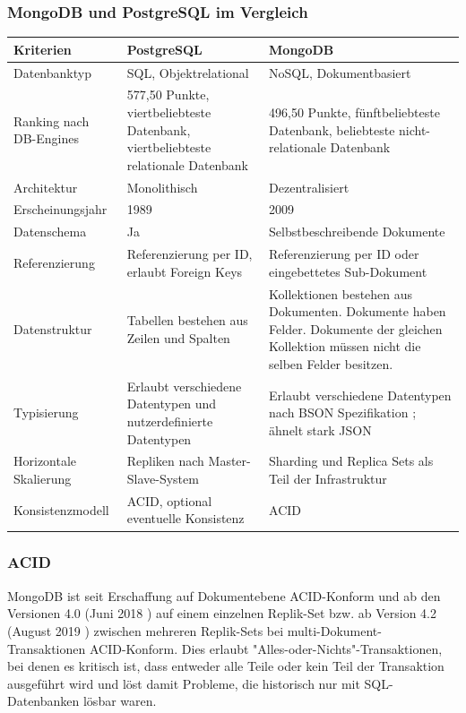 \subsubsection{MongoDB und PostgreSQL im Vergleich}

\begin{center}
    \begin{tabularx}{\linewidth}{ |X|X|X| } 
     \hline
     Kriterien & PostgreSQL & MongoDB  \\ 
     \hline
     Datenbanktyp & SQL, Objektrelational & NoSQL, Dokumentbasiert \\
     Ranking nach DB-Engines \cite{DB1} & 577,50 Punkte, viertbeliebteste Datenbank, viertbeliebteste relationale Datenbank & 496,50 Punkte, fünftbeliebteste Datenbank, beliebteste nicht-relationale Datenbank \cite{DB2} \\
     Architektur & Monolithisch & Dezentralisiert \\
     Erscheinungsjahr & 1989 & 2009 \\
     Datenschema & Ja & Selbstbeschreibende Dokumente\\
     Referenzierung & Referenzierung per ID, erlaubt Foreign Keys & Referenzierung per ID oder eingebettetes Sub-Dokument \\
     Datenstruktur & Tabellen bestehen aus Zeilen und Spalten & Kollektionen bestehen aus Dokumenten. Dokumente haben Felder. Dokumente der gleichen Kollektion müssen nicht die selben Felder besitzen. \\
     Typisierung & Erlaubt verschiedene Datentypen und nutzerdefinierte Datentypen\cite{PG5} & Erlaubt verschiedene Datentypen nach BSON Spezifikation \cite{MG3}; ähnelt stark JSON \\
     Horizontale Skalierung & Repliken nach Master-Slave-System \cite{PG6} & Sharding und Replica Sets als Teil der Infrastruktur \cite{MG4} \cite{MG5} \\
     Konsistenzmodell & ACID, optional eventuelle Konsistenz \cite{MG6} \cite{MG7} & ACID \\
     \hline
    \end{tabularx}
    \cite{DB3} \cite{DB4}
\end{center}

\subsubsection{ACID}
 MongoDB ist seit Erschaffung auf Dokumentebene ACID-Konform und ab den Versionen 4.0 (Juni 2018 \cite{MG8}) auf einem einzelnen Replik-Set bzw. ab Version 4.2 (August 2019 \cite{MG8}) zwischen mehreren Replik-Sets bei multi-Dokument-Transaktionen ACID-Konform. \cite{MG6} Dies erlaubt "Alles-oder-Nichts"-Transaktionen, bei denen es kritisch ist, dass entweder alle Teile oder kein Teil der Transaktion ausgeführt wird und löst damit Probleme, die historisch nur mit SQL-Datenbanken lösbar waren.


